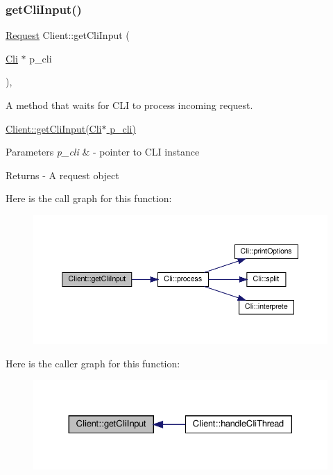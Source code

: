\subsubsection{\texorpdfstring{get\+Cli\+Input()}{getCliInput()}}
{\footnotesize\ttfamily \hyperlink{classRequest}{Request} Client\+::get\+Cli\+Input (\begin{DoxyParamCaption}\item[{\hyperlink{classCli}{Cli} $\ast$}]{p\+\_\+cli }\end{DoxyParamCaption})\hspace{0.3cm}{\ttfamily [static]}, {\ttfamily [private]}}



A method that waits for C\+LI to process incoming request. 

\hyperlink{classClient_abd9bf3421bbc1e0ad11685cc95af53a8}{Client\+::get\+Cli\+Input(\+Cli$\ast$ p\+\_\+cli)} 
\begin{DoxyParams}{Parameters}
{\em p\+\_\+cli} & -\/ pointer to C\+LI instance \\
\hline
\end{DoxyParams}
\begin{DoxyReturn}{Returns}
-\/ A request object 
\end{DoxyReturn}
Here is the call graph for this function\+:\nopagebreak
\begin{figure}[H]
\begin{center}
\leavevmode
\includegraphics[width=350pt]{classClient_abd9bf3421bbc1e0ad11685cc95af53a8_cgraph}
\end{center}
\end{figure}
Here is the caller graph for this function\+:\nopagebreak
\begin{figure}[H]
\begin{center}
\leavevmode
\includegraphics[width=330pt]{classClient_abd9bf3421bbc1e0ad11685cc95af53a8_icgraph}
\end{center}
\end{figure}
\mbox{\label{classClient_a8030bdb7d7857907110ad45883b01511}} 
